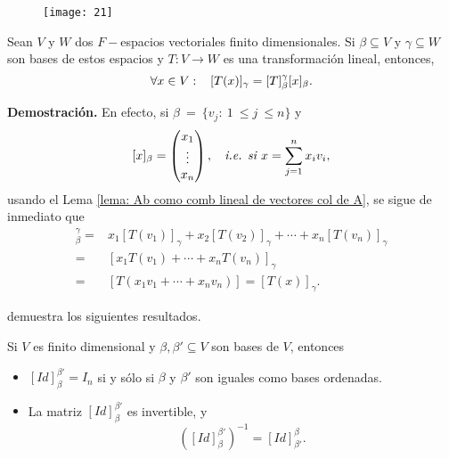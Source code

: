 \begin{figure}[H]
\centering\captionsetup{format = hang}
		\texttt{[image: 21]}
 \end{figure}
\QEDB 
\vspace{0.2cm}

\begin{teo}
	\label{teo: calculando Tx en terminos de representaciones matriciales}
Sean $V$ y $W$ dos $F-$espacios vectoriales finito dimensionales.
Si $\beta \subseteq V$ y $\gamma \subseteq W$ son bases de estos espacios
y $T: V \longrightarrow W$ es una transformación lineal, 
entonces, 
\[
\forall x \in V: \hspace{0.3cm} 
[T(x)]_{\gamma} = [T]_{\beta}^{\gamma} [x]_{\beta}.
\]
\end{teo}
\noindent
\textbf{Demostración.}
En efecto, 
si $\beta \ =\ \{v_{j} :\ 1\ \leq j\ \leq n \}$ y
\[
[x]_{\beta} = \begin{pmatrix}
x_{1} \\
\vdots \\
x_{n}
\end{pmatrix},
\hspace{0.2cm} \textit{ i.e. si }
x = \sum_{j=1}^{n} x_{i}v_{i},
\]
usando el Lema \ref{lema: Ab como comb lineal de vectores col de A},
se sigue de inmediato que 
\begin{align*}
[T]_{\beta}^{\gamma} = & 
x_{1} [T(v_{1})]_{\gamma} + x_{2} [T(v_{2})]_{\gamma} + \cdots + 
x_{n}[T(v_{n})]_{\gamma} \\
= & [x_{1}T(v_{1}) + \cdots + 
x_{n} T(v_{n})]_{\gamma} \\
= & [T(x_{1}v_{1} + \cdots + x_{n}v_{n})] = [T(x)]_{\gamma}.
\end{align*}

\QEDB
\vspace{0.2cm}


 demuestra los siguientes resultados.
\begin{prop}
	Si $V$ es finito dimensional y 
	$\beta, \beta' \subseteq V$ son bases de $V$, entonces 
	\begin{itemize}
		\item $[Id]_{\beta}^{\beta'} = I_{n}$ si y sólo si $\beta$
		y $\beta'$ son iguales como bases ordenadas.
		\item La matriz $[Id]_{\beta}^{\beta'}$ es invertible, y 
		$$([Id]_{\beta}^{\beta'})^{-1} = [Id]_{\beta'}^{\beta}.$$
	\end{itemize}
\end{prop}


